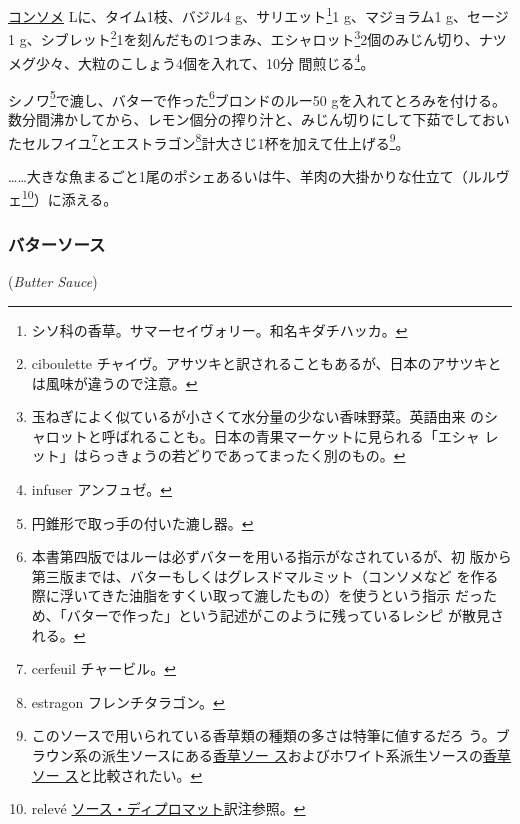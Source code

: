 \begin{recette}
\protect\hyperlink{consomme-blanc}{コンソメ}\undemi{}
Lに、タイム1枝、バジル4 g、サリエット\footnote{シソ科の香草。サマーセイヴォリー。和名キダチハッカ。}1
g、マジョラム1 g、セージ1 g、シブレット\footnote{ciboulette
  チャイヴ。アサツキと訳されることもあるが、日本のアサツキとは風味が違うので注意。}1を刻んだもの1つまみ、エシャロット\footnote{玉ねぎによく似ているが小さくて水分量の少ない香味野菜。英語由来
  のシャロットと呼ばれることも。日本の青果マーケットに見られる「エシャ
  レット」はらっきょうの若どりであってまったく別のもの。}2個のみじん切り、ナツメグ少々、大粒のこしょう4個を入れて、10分
間煎じる\footnote{infuser アンフュゼ。}。

シノワ\footnote{円錐形で取っ手の付いた漉し器。}で漉し、バターで作った\footnote{本書第四版ではルーは必ずバターを用いる指示がなされているが、初
  版から第三版までは、バターもしくはグレスドマルミット（コンソメなど
  を作る際に浮いてきた油脂をすくい取って漉したもの）を使うという指示
  だっため、「バターで作った」という記述がこのように残っているレシピ
  が散見される。}ブロンドのルー50
gを入れてとろみを付ける。数分間沸かしてから、レモン\undemi{}個分の搾り汁と、みじん切りにして下茹でしておいたセルフイユ\footnote{cerfeuil
  チャービル。}とエストラゴン\footnote{estragon フレンチタラゴン。}計大さじ1杯を加えて仕上げる\footnote{このソースで用いられている香草類の種類の多さは特筆に値するだろ
  う。ブラウン系の派生ソースにある\protect\hyperlink{sauce-aux-fines-herbes}{香草ソー
  ス}およびホワイト系派生ソースの\protect\hyperlink{sauce-aux-fines-herbes-blanche}{香草ソー
  ス}と比較されたい。}。

\ldots{}\ldots{}大きな魚まるごと1尾のポシェあるいは牛、羊肉の大掛かりな仕立て（ルルヴェ\footnote{relevé
  \protect\hyperlink{sauce-diplomate}{ソース・ディプロマット}訳注参照。}）に添える。

\maeaki

\hypertarget{butter-sauce}{%
\subsubsection{バターソース}\label{butter-sauce}}

 (\emph{Butter Sauce})



\end{recette}
